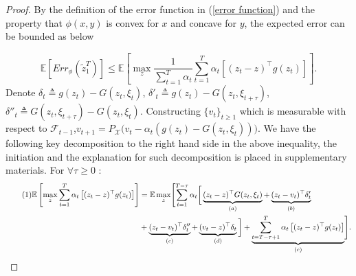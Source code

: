 \documentclass[twoside,11pt]{article}
\numberwithin{equation}{section}
\newcommand{\E}{\mathbb{E}}
\newcommand{\huaf}{\mathcal{F}}
\newcommand\numberthis{\addtocounter{equation}{1}\tag{\theequation}}
\begin{document}
	\begin{proof} 
		By the definition of the error function in (\ref{error function}) and the property that $ \phi(x,y) $ is convex for $ x $ and concave for $ y $, the expected error can be bounded as below
		 
		$$    \E \left[ Err_\phi(\tilde{z}_1^T)\right]  \le \E \left[ \max_z \frac{1}{\sum_{t=1}^{T}\alpha_t}\sum_{t=1}^{T}\alpha_t \left[(z_t-z)^\top g(z_t) \right] \right].$$ 
		Denote $ \delta_t \triangleq g(z_t) - G(z_t,\xi_{t}) $, $ \delta'_t \triangleq g (z_t) - G( z_t,\xi_{t+\tau} ) $,  $ \delta''_t \triangleq G (z_t,\xi_{t+\tau}) -  G (z_t,\xi_{t})  $. Constructing  $ \lbrace v_t \rbrace_{t\ge 1} $  which is measurable with respect to $ \huaf_{t-1} $,$v_{t+1} = P_{\mathcal{X}}\big(v_t - \alpha_t( g (z_t) - G(z_t,\xi_{t})) \big) $. We have the following key decomposition to the right hand side in the above inequality,  the initiation and the explanation for such decomposition is placed in supplementary materials. For $ \forall \tau \ge 0$ :	 
		 \begin{align*}\numberthis\label{keydecomposition} 
		\E\left[ \max_z \sum_{t=1}^{T}\alpha_t \left[(z_t-z)^\top g(z_t) \right] \right] & =	 \E  \max_z \Biggl[ \sum\limits_{t=1}^{T-\tau}\alpha_t \bigg[\underbrace{(z_t-z)^\top  G (z_t,\xi_{t})}_{(a)} +\underbrace{(z_t-v_t)^\top \delta'_t}_{(b)}  \\
		& + \underbrace{(z_t-v_t)^\top \delta''_t}_{(c)} + \underbrace{(v_t-z)^\top \delta_t }_{(d)}    \bigg]
		+  \underbrace{ \sum_{t=T-\tau + 1}^{T}\alpha_t \left[(z_t-z)^\top g(z_t)\right]}_{(e)}\Biggr]  .
		\end{align*} 	  
		
		

\end{proof}
\end{document}
